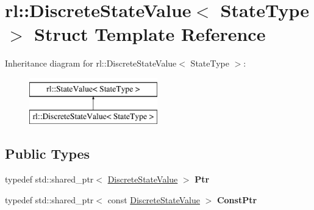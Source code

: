 \hypertarget{structrl_1_1_discrete_state_value}{}\section{rl\+:\+:Discrete\+State\+Value$<$ State\+Type $>$ Struct Template Reference}
\label{structrl_1_1_discrete_state_value}
Inheritance diagram for rl\+:\+:Discrete\+State\+Value$<$ State\+Type $>$\+:\begin{figure}[H]
\begin{center}
\leavevmode
\includegraphics[height=2.000000cm]{structrl_1_1_discrete_state_value}
\end{center}
\end{figure}
\subsection*{Public Types}
\begin{DoxyCompactItemize}
\item 
\hypertarget{structrl_1_1_discrete_state_value_a309f3a252989c000f53ea6d6dd45f3ef}{}\label{structrl_1_1_discrete_state_value_a309f3a252989c000f53ea6d6dd45f3ef} 
typedef std\+::shared\+\_\+ptr$<$ \hyperlink{structrl_1_1_discrete_state_value}{Discrete\+State\+Value} $>$ {\bfseries Ptr}
\item 
\hypertarget{structrl_1_1_discrete_state_value_ab1136e66db7c4f40735dbcacaf33f749}{}\label{structrl_1_1_discrete_state_value_ab1136e66db7c4f40735dbcacaf33f749} 
typedef std\+::shared\+\_\+ptr$<$ const \hyperlink{structrl_1_1_discrete_state_value}{Discrete\+State\+Value} $>$ {\bfseries Const\+Ptr}
\end{DoxyCompactItemize}
